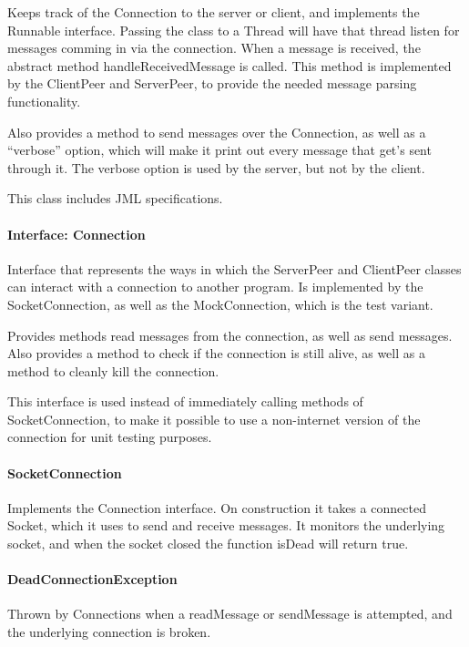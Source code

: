 \documentclass[12pt, letterpaper]{article}
\begin{document}
    Keeps track of the Connection to the server or client, and implements the Runnable interface.
    Passing the class to a Thread will have that thread listen for messages comming in via the connection.
    When a message is received, the abstract method handleReceivedMessage is called.
    This method is implemented by the ClientPeer and ServerPeer, to provide the needed message parsing functionality.

    Also provides a method to send messages over the Connection, as well as a ``verbose'' option, which will make it
    print out every message that get's sent through it.
    The verbose option is used by the server, but not by the client.

    This class includes JML specifications.

    \paragraph{Interface: Connection}
    Interface that represents the ways in which the ServerPeer and ClientPeer classes can interact with a connection to
    another program.
    Is implemented by the SocketConnection, as well as the MockConnection, which is the test variant.

    Provides methods read messages from the connection, as well as send messages.
    Also provides a method to check if the connection is still alive, as well as a method to
    cleanly kill the connection.

    This interface is used instead of immediately calling methods of SocketConnection, to make it possible to use
    a non-internet version of the connection for unit testing purposes.

    \paragraph{SocketConnection}
    Implements the Connection interface.
    On construction it takes a connected Socket, which it uses to send and receive messages.
    It monitors the underlying socket, and when the socket closed the function isDead will return true.


    \paragraph{DeadConnectionException}
    Thrown by Connections when a readMessage or sendMessage is attempted, and the underlying connection is broken.
\end{document}
